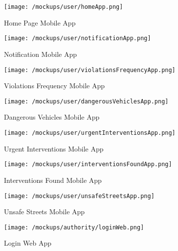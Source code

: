 	\begin{figure}[ht!]
		\centering
		\begin{minipage}{0.5\textwidth}
			\centering
			\texttt{[image: /mockups/user/homeApp.png]}
			\caption{Home Page Mobile App}
		\end{minipage}\hfill
		\begin{minipage}{0.5\textwidth}
			\centering
			\texttt{[image: /mockups/user/notificationApp.png]}
			\caption{Notification Mobile App}
		\end{minipage}
	\end{figure}

	\begin{figure}[h]
		\centering
		\begin{minipage}{0.45\textwidth}
			\centering
			\texttt{[image: /mockups/user/violationsFrequencyApp.png]}
			\caption{Violations Frequency Mobile App}
		\end{minipage}\hfill
		\begin{minipage}{0.45\textwidth}
			\centering
			\texttt{[image: /mockups/user/dangerousVehiclesApp.png]}
			\caption{Dangerous Vehicles Mobile App}
		\end{minipage}
	\end{figure}

	\begin{figure}[h]
		\centering
		\begin{minipage}{0.45\textwidth}
			\centering
			\texttt{[image: /mockups/user/urgentInterventionsApp.png]}
			\caption{Urgent Interventions Mobile App}
		\end{minipage}\hfill
		\begin{minipage}{0.45\textwidth}
			\centering
			\texttt{[image: /mockups/user/interventionsFoundApp.png]}
			\caption{Interventions Found Mobile App}
		\end{minipage}
	\end{figure}

	\begin{figure}[h]
		\centering
		\begin{minipage}{0.45\textwidth}
			\centering
			\texttt{[image: /mockups/user/unsafeStreetsApp.png]}
			\caption{Unsafe Streets Mobile App}
		\end{minipage}
	\end{figure}
	
	\begin{figure}[h]
		\centering
		\texttt{[image: /mockups/authority/loginWeb.png]}
		\caption{Login Web App}
	\end{figure}


